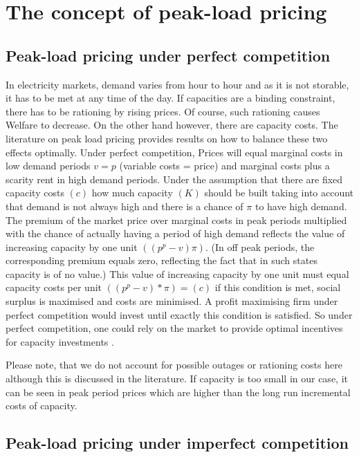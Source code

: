 \section{The concept of peak-load pricing}

\subsection{Peak-load pricing under perfect competition}

In electricity markets, demand varies from hour to hour and as it is not storable, it has to be met at any time of the day. If capacities are a binding constraint, there has to be rationing by rising prices. Of course, such rationing causes Welfare to decrease. On the other hand however, there are capacity costs. The literature on peak load pricing provides results on how to balance these two effects optimally. Under perfect competition, Prices will equal marginal costs in low demand periods $v=p$ (variable costs = price) and marginal costs plus a scarity rent in high demand periods. Under the assumption that there are fixed capacity costs $(c)$ how much capacity $(K)$ should be built taking into account that demand is not always high and there is a chance of $\pi$ to have high demand. The premium of the market price over marginal costs in peak periods multiplied with the chance of actually having a period of high demand reflects the value of increasing capacity by one unit $((p^p-v)\pi)$. (In off peak periods, the corresponding premium equals zero, reflecting the fact that in such states capacity is of no value.) This value of increasing capacity by one unit must equal capacity costs per unit $((p^p-v)*\pi)=(c)$ if this condition is met, social surplus is maximised and costs are minimised. A profit maximising firm under perfect competition would invest until exactly this condition is satisfied. So under perfect competition, one could rely on the market to provide optimal incentives for capacity investments \citep[see][]{Fehr1995}.

Please note, that we do not account for possible outages or rationing costs here although this is discussed in the literature. If capacity is too small in our case, it can be seen in peak period prices which are higher than the long run incremental costs of capacity.

\subsection{Peak-load pricing under imperfect competition}

